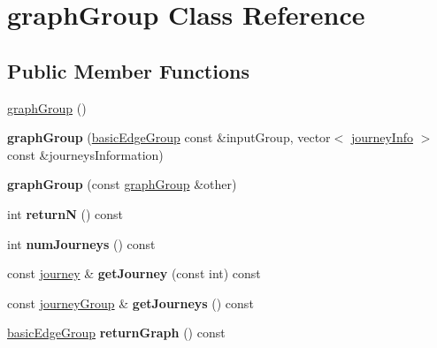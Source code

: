 \hypertarget{classgraphGroup}{
\section{graphGroup Class Reference}
\label{classgraphGroup}
}
\subsection*{Public Member Functions}
\begin{DoxyCompactItemize}
\item 
\hyperlink{classgraphGroup_aa79781484ddc1bd2bd4fe0ff7d334d7e}{graphGroup} ()
\item 
\hypertarget{classgraphGroup_ad8deef5a5d7bddd7795f18fd069f4ba2}{
{\bfseries graphGroup} (\hyperlink{classbasicEdgeGroup}{basicEdgeGroup} const \&inputGroup, vector$<$ \hyperlink{classjourneyInfo}{journeyInfo} $>$ const \&journeysInformation)}
\label{classgraphGroup_ad8deef5a5d7bddd7795f18fd069f4ba2}

\item 
\hypertarget{classgraphGroup_a27bebec42786a5435b9644ef9b76bcba}{
{\bfseries graphGroup} (const \hyperlink{classgraphGroup}{graphGroup} \&other)}
\label{classgraphGroup_a27bebec42786a5435b9644ef9b76bcba}

\item 
\hypertarget{classgraphGroup_a8afd99b83e35562cae88f13451d0ae82}{
int {\bfseries returnN} () const }
\label{classgraphGroup_a8afd99b83e35562cae88f13451d0ae82}

\item 
\hypertarget{classgraphGroup_ae6a8df22b20ae856a7bb107d0469a207}{
int {\bfseries numJourneys} () const }
\label{classgraphGroup_ae6a8df22b20ae856a7bb107d0469a207}

\item 
\hypertarget{classgraphGroup_a99d752f287b49444c0d61b3cb3cd3f67}{
const \hyperlink{classjourney}{journey} \& {\bfseries getJourney} (const int) const }
\label{classgraphGroup_a99d752f287b49444c0d61b3cb3cd3f67}

\item 
\hypertarget{classgraphGroup_ad29ba81d69edb6e3101e20cee7645be7}{
const \hyperlink{classjourneyGroup}{journeyGroup} \& {\bfseries getJourneys} () const }
\label{classgraphGroup_ad29ba81d69edb6e3101e20cee7645be7}

\item 
\hypertarget{classgraphGroup_a57c8ca8bc06a98e67842915d8607c39c}{
\hyperlink{classbasicEdgeGroup}{basicEdgeGroup} {\bfseries returnGraph} () const }
\label{classgraphGroup_a57c8ca8bc06a98e67842915d8607c39c}


\end{DoxyCompactItemize}
